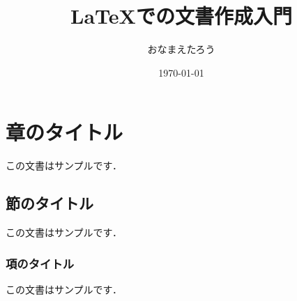 \documentclass{jarticle}
\title{LaTeXでの文書作成入門}
\author{おなまえたろう}
\date{\today}
\begin{document}

\maketitle

\section{章のタイトル}
この文書はサンプルです．

\subsection{節のタイトル}
この文書はサンプルです．

\subsubsection{項のタイトル}
この文書はサンプルです．
\end{document}
